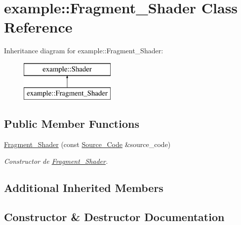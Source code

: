 \hypertarget{classexample_1_1_fragment___shader}{}\section{example\+::Fragment\+\_\+\+Shader Class Reference}
\label{classexample_1_1_fragment___shader}
Inheritance diagram for example\+::Fragment\+\_\+\+Shader\+:\begin{figure}[H]
\begin{center}
\leavevmode
\includegraphics[height=2.000000cm]{classexample_1_1_fragment___shader}
\end{center}
\end{figure}
\subsection*{Public Member Functions}
\begin{DoxyCompactItemize}
\item 
\mbox{\hyperlink{classexample_1_1_fragment___shader_a3950097f56bb66b2bf35ce2942976744}{Fragment\+\_\+\+Shader}} (const \mbox{\hyperlink{classexample_1_1_shader_1_1_source___code}{Source\+\_\+\+Code}} \&source\+\_\+code)
\begin{DoxyCompactList}\small\item\em Constructor de \mbox{\hyperlink{classexample_1_1_fragment___shader}{Fragment\+\_\+\+Shader}}. \end{DoxyCompactList}\end{DoxyCompactItemize}
\subsection*{Additional Inherited Members}


\subsection{Constructor \& Destructor Documentation}
\mbox{\label{classexample_1_1_fragment___shader_a3950097f56bb66b2bf35ce2942976744}} 
